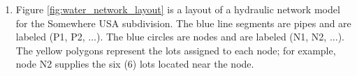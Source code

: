 \documentclass[12pt]{article}
\begin{document}
\begin{enumerate}
%
%
\item Figure \ref{fig:water_network_layout} is a layout of a hydraulic network model for the Somewhere USA subdivision.   
The blue line segments are pipes and are labeled (P1, P2, $\dots$).   
The blue circles are nodes and are labeled (N1, N2, $\dots$).
The yellow polygons represent the lots assigned to each node; for example, node N2 supplies the six (6) lots located near the node.

\end{enumerate}
\end{document}
